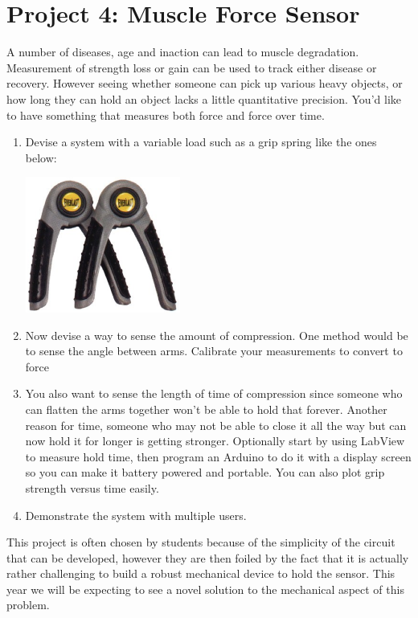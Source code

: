 \documentclass[12pt]{article}
\begin{document}
\newpage

\section*{Project 4: Muscle Force Sensor}

A number of diseases, age and inaction can lead to muscle degradation. 
Measurement of strength loss or gain can be used to track either disease or recovery. 
However seeing whether someone can pick up various heavy objects, 
or how long they can hold an object lacks a little quantitative precision. 
You'd like to have something that measures both force and force over time.

\begin{enumerate}
\item Devise a system with a variable load such as a grip spring like the ones below:\\
\begin{center}
\includegraphics[width=0.4\textwidth]{gripspring.png}
\end{center}
\item Now devise a way to sense the amount of compression. 
One method would be to sense the angle between arms.
Calibrate your measurements to convert to force
\item You also want to sense the length of time of compression since someone who can flatten the arms together won't be able to hold that forever. 
Another reason for time, someone who may not be able to close it all the way but can now hold it for longer is getting stronger.
Optionally start by using LabView to measure hold time, then program an Arduino to do it with a display screen so you can make it battery powered and portable. You can also plot grip strength versus time easily.
\item Demonstrate the system with multiple users.
\end{enumerate}

This project is often chosen by students because of the simplicity of the circuit that can be developed,
however they are then foiled by the fact that it is actually rather challenging to build a robust mechanical
device to hold the sensor. 
This year we will be expecting to see a novel solution to the mechanical aspect of  this problem. 
\end{document}
